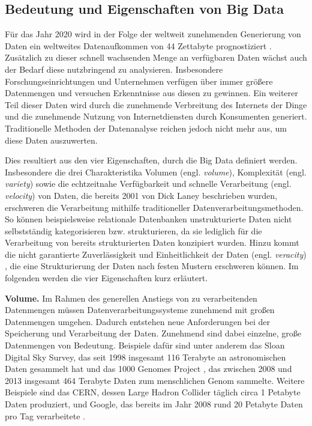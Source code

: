 \subsection{Bedeutung und Eigenschaften von Big Data}
\label{sec:BigData}
Für das Jahr 2020 wird in der Folge der weltweit zunehmenden Generierung von Daten ein weltweites Datenaufkommen von 44 Zettabyte prognostiziert \cite{EMC2014}. Zusätzlich zu dieser schnell wachsenden Menge an verfügbaren Daten wächst auch der Bedarf diese nutzbringend zu analysieren. Insbesondere Forschungseinrichtungen und Unternehmen verfügen über immer größere Datenmengen und versuchen Erkenntnisse aus diesen zu gewinnen. Ein weiterer Teil dieser Daten wird durch die zunehmende Verbreitung des Internets der Dinge und die zunehmende Nutzung von Internetdiensten durch Konsumenten generiert. Traditionelle Methoden der Datenanalyse reichen jedoch nicht mehr aus, um diese Daten auszuwerten. 

Dies resultiert aus den vier Eigenschaften, durch die Big Data definiert werden. Insbesondere die drei Charakteristika Volumen (engl. \textit{volume}), Komplexität (engl. \textit{variety}) sowie die echtzeitnahe Verfügbarkeit und schnelle Verarbeitung (engl. \textit{velocity}) von Daten, die bereits 2001 von Dick Laney \cite{Laney2001} beschrieben wurden, erschweren die Verarbeitung mithilfe traditioneller Datenverarbeitungsmethoden. So können beispielsweise relationale Datenbanken unstrukturierte Daten nicht selbstständig kategorisieren bzw. strukturieren, da sie lediglich für die Verarbeitung von bereits strukturierten Daten konzipiert wurden. Hinzu kommt die nicht garantierte Zuverlässigkeit und Einheitlichkeit der Daten (engl. \textit{veracity}) \cite{Zikopoulos2012}, die eine Strukturierung der Daten nach festen Mustern erschweren können. Im folgenden werden die vier Eigenschaften kurz erläutert.

\textbf{Volume.} Im Rahmen des generellen Anstiegs von zu verarbeitenden Datenmengen müssen Datenverarbeitungssysteme zunehmend mit großen Datenmengen umgehen. Dadurch entstehen neue Anforderungen bei der Speicherung und Verarbeitung der Daten. 
Zunehmend sind dabei einzelne, große Datenmengen von Bedeutung. Beispiele dafür sind unter anderem das Sloan Digital Sky Survey, das seit 1998 insgesamt 116 Terabyte an astronomischen Daten gesammelt hat \cite{York2000, Alam2015} und das 1000 Genomes Project \cite{Baker2010}, das zwischen 2008 und 2013 insgesamt 464 Terabyte Daten zum menschlichen Genom sammelte. Weitere Beispiele sind das CERN, dessen Large Hadron Collider täglich circa 1 Petabyte Daten produziert, und Google, das bereits im Jahr 2008 rund 20 Petabyte Daten pro Tag verarbeitete \cite{Dean2008}.

